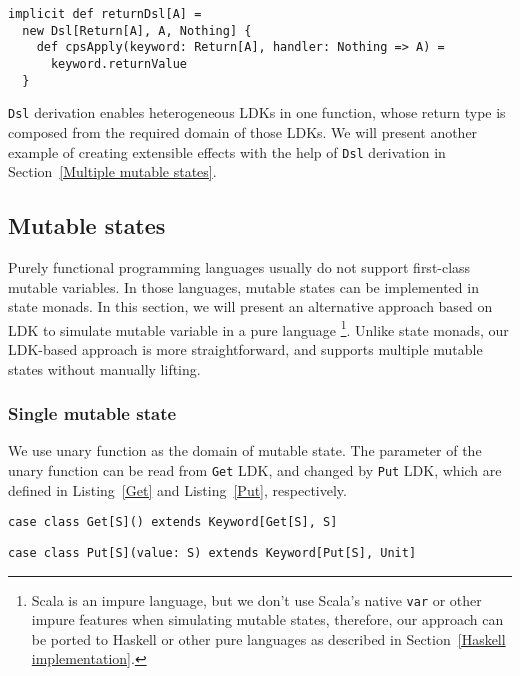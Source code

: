 \begin{lstlisting}[caption={The \lstinline{Dsl} instance of \lstinline{Return} LDK, to skip the registered callback function},label={returnDsl}]
implicit def returnDsl[A] =
  new Dsl[Return[A], A, Nothing] {
    def cpsApply(keyword: Return[A], handler: Nothing => A) =
      keyword.returnValue
  }
\end{lstlisting}

\lstinline{Dsl} derivation enables heterogeneous LDKs in one function, whose return type is composed from the required domain of those LDKs. We will present another example of creating extensible effects with the help of \lstinline{Dsl} derivation in Section~\ref{Multiple mutable states}.

\subsection{Mutable states}

Purely functional programming languages usually do not support first-class mutable variables. In those languages, mutable states can be implemented in state monads. In this section, we will present an alternative approach based on LDK to simulate mutable variable in a pure language \footnote{Scala is an impure language, but we don't use Scala's native \lstinline{var} or other impure features when simulating mutable states, therefore, our approach can be ported to Haskell or other pure languages as described in Section~\ref{Haskell implementation}.}. Unlike state monads, our LDK-based approach is more straightforward, and supports multiple mutable states without manually lifting.

\subsubsection{Single mutable state}

We use unary function as the domain of mutable state. The parameter of the unary function can be read from \lstinline{Get} LDK, and changed by \lstinline{Put} LDK, which are defined in Listing~\ref{Get} and Listing~\ref{Put}, respectively.

\begin{lstlisting}[caption={The definition of \lstinline{Get} LDK},label={Get}]
case class Get[S]() extends Keyword[Get[S], S]
\end{lstlisting}

\begin{lstlisting}[caption={The definition of \lstinline{Put} LDK},label={Put}]
case class Put[S](value: S) extends Keyword[Put[S], Unit]
\end{lstlisting}

